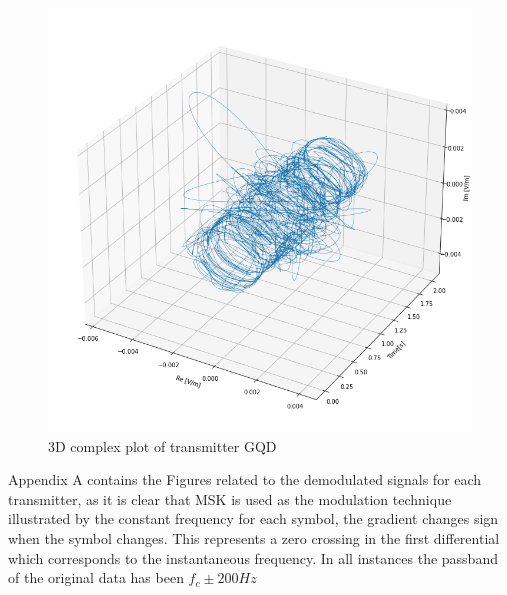 \begin{figure}[h!]
    \centering
    \includegraphics[width = \textwidth]{figs/sig_character/gqd3D.png}
    \caption{3D complex plot of transmitter GQD}
    \label{fig:gqd3d}
\end{figure}

Appendix A contains the Figures related to the demodulated signals for each transmitter, as it is clear that MSK is used as the modulation technique illustrated by the constant frequency for each symbol, the gradient changes sign when the symbol changes. This represents a zero crossing in the first differential which corresponds to the instantaneous frequency. In all instances the passband of the original data has been $f_c \pm 200Hz$
\pagebreak
